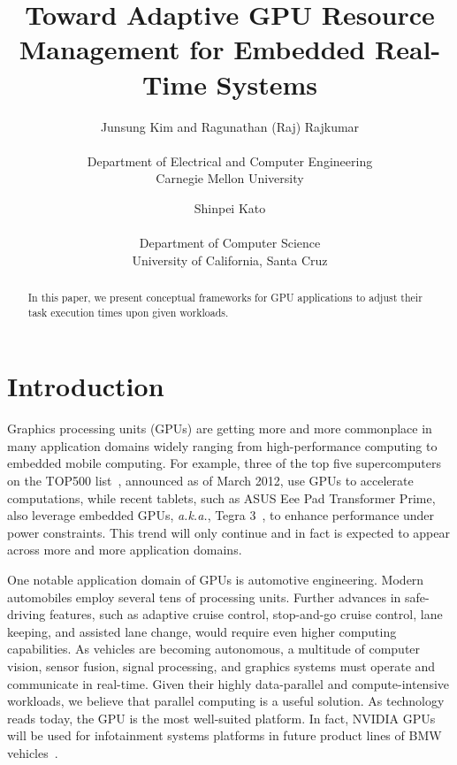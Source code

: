 \documentclass[times, 10pt, twocolumn]{article}
\begin{document}
\title{
Toward Adaptive GPU Resource Management for Embedded Real-Time Systems
}

\author {
Junsung Kim and Ragunathan (Raj) Rajkumar\\
\\
Department of Electrical and Computer Engineering\\
Carnegie Mellon University
\and
Shinpei Kato\\
\\
Department of Computer Science\\
University of California, Santa Cruz
}

\maketitle

\thispagestyle{empty}

\begin{abstract}
 In this paper, we present conceptual frameworks for GPU applications to
 adjust their task execution times upon given workloads.
\end{abstract}

\section{Introduction}
\label{sec:introduction}

Graphics processing units (GPUs) are getting more and more commonplace
in many application domains widely ranging from high-performance
computing to embedded mobile computing.
For example, three of the top five supercomputers on the TOP500
list~\cite{TOP500}, announced as of March 2012, use GPUs to accelerate
computations, while recent tablets, such as ASUS Eee Pad Transformer
Prime, also leverage embedded GPUs, \textit{a.k.a.}, Tegra
3~\cite{Tegra3}, to enhance performance under power constraints.
This trend will only continue and in fact is expected to appear across
more and more application domains.

One notable application domain of GPUs is automotive engineering.
Modern automobiles employ several tens of processing units.
Further advances in safe-driving features, such as adaptive
cruise control, stop-and-go cruise control, lane keeping, and assisted
lane change, would require even higher computing capabilities.
As vehicles are becoming autonomous, a multitude of computer vision,
sensor fusion, signal processing, and graphics systems must operate and
communicate in real-time.
Given their highly data-parallel and compute-intensive workloads, 
we believe that parallel computing is a useful solution.
As technology reads today, the GPU is the most well-suited platform.
In fact, NVIDIA GPUs will be used for infotainment systems platforms in
future product lines of BMW vehicles~\cite{NVIDIA_BMW}.
\end{document}
